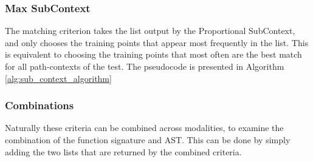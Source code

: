 \subsubsection{Max SubContext}


The matching criterion takes the list output by the Proportional SubContext, and only chooses the training points that appear most frequently in the list. This is equivalent to choosing the training points that most often are the best match for all path-contexts of the test. The pseudocode is presented in Algorithm \ref{alg:sub_context_algorithm} 



\subsubsection{Combinations}

Naturally these criteria can be combined across modalities, to examine the combination of the function signature and AST. This can be done by simply adding the two lists that are returned by the combined criteria. 

